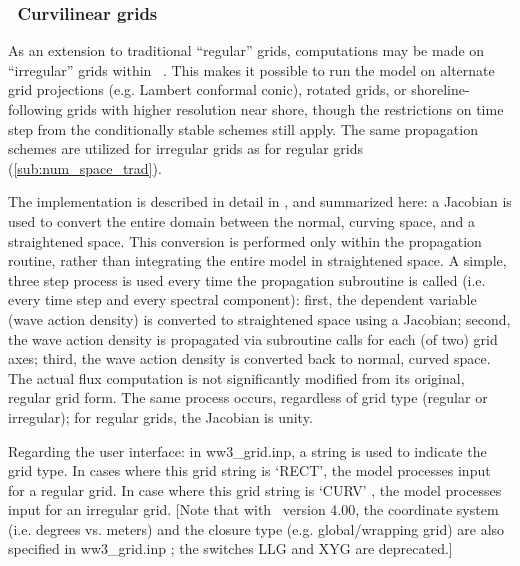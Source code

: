 \vssub
\subsubsection{~Curvilinear grids} \label{sub:num_space_curv}

\noindent 
As an extension to traditional ``regular'' grids, computations may be made on ``irregular'' 
grids within \ws\ . This makes it possible to run the model on alternate grid
projections (e.g. Lambert conformal conic), rotated grids, or
shoreline-following grids with higher resolution near shore, though the
restrictions on time step from the conditionally stable schemes still
apply. The same propagation schemes are utilized for irregular grids as for
regular grids (\para\ref{sub:num_space_trad}).

The implementation is described in detail in \cite{rep:RC09}, and summarized
here: a Jacobian is used to convert the entire domain between the normal,
curving space, and a straightened space. This conversion is performed only
within the propagation routine, rather than integrating the entire model in
straightened space. A simple, three step process is used every time the
propagation subroutine is called (i.e. every time step and every spectral
component): first, the dependent variable (wave action density) is converted
to straightened space using a Jacobian; second, the wave action density is
propagated via subroutine calls for each (of two) grid axes; third, the wave
action density is converted back to normal, curved space. The actual flux
computation is not significantly modified from its original, regular grid
form. The same process occurs, regardless of grid type (regular or irregular);
for regular grids, the Jacobian is unity.

Regarding the user interface: in {\file ww3\_grid.inp}, a string is used to
indicate the grid type. In cases where this grid string is `{\code RECT}', the
model processes input for a regular grid. In case where this grid string is
`{\code CURV}' , the model processes input for an irregular grid. [Note that
with \ws\ version 4.00, the coordinate system (i.e. degrees vs. meters) and
the closure type (e.g. global/wrapping grid) are also specified in {\file
ww3\_grid.inp} ; the switches {\code LLG} and {\code XYG} are deprecated.]

